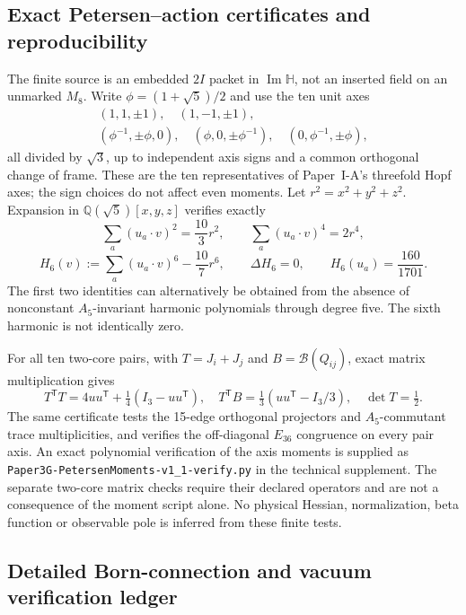 \documentclass[11pt,a4paper]{article}
\begin{document}
\subsection{Exact Petersen--action certificates and reproducibility}
\label{p3g:sec:v319-petersen-certificate}
The finite source is an embedded $2I$ packet in
$\operatorname{Im}\mathbb H$, not an inserted field on an unmarked
$M_8$.  Write $\phi=(1+\sqrt5)/2$ and use the ten unit axes
\[
 \begin{gathered}
 (1,1,\pm1),\quad(1,-1,\pm1),\\
 (\phi^{-1},\pm\phi,0),\quad
 (\phi,0,\pm\phi^{-1}),\quad
 (0,\phi^{-1},\pm\phi),
 \end{gathered}
\]
all divided by $\sqrt3$, up to independent axis signs and a common
orthogonal change of frame.  These are the ten representatives of
Paper~I-A's threefold Hopf axes; the sign choices do not affect even
moments.  Let $r^2=x^2+y^2+z^2$.  Expansion in
$\mathbb Q(\sqrt5)[x,y,z]$ verifies exactly
\[
 \sum_a(u_a\cdot v)^2=\frac{10}{3}r^2,\qquad
 \sum_a(u_a\cdot v)^4=2r^4,
\]
\[
 H_6(v):=\sum_a(u_a\cdot v)^6-\frac{10}{7}r^6,\qquad
 \Delta H_6=0,\qquad H_6(u_a)=\frac{160}{1701}.
\]
The first two identities can alternatively be obtained from the
absence of nonconstant $A_5$-invariant harmonic polynomials through
degree five.  The sixth harmonic is not identically zero.

For all ten two-core pairs, with $T=J_i+J_j$ and
$B=\mathcal B(Q_{ij})$, exact matrix multiplication gives
\[
 T^{\mathsf T}T=4uu^{\mathsf T}+\tfrac14(I_3-uu^{\mathsf T}),
\quad T^{\mathsf T}B=\tfrac13(uu^{\mathsf T}-I_3/3),
\quad \det T=\tfrac12.
\]
The same certificate tests the 15-edge orthogonal projectors and
$A_5$-commutant trace multiplicities, and verifies the off-diagonal
$E_{36}$ congruence on every pair axis.  An exact polynomial verification of the axis moments is supplied as
\texttt{Paper3G-PetersenMoments-v1\_1-verify.py} in the
technical supplement. The separate two-core matrix checks require their declared operators and are not a consequence of the moment script alone. No physical Hessian, normalization, beta function or
observable pole is inferred from these finite tests.


\subsection{Detailed Born-connection and vacuum verification ledger}
\label{p3g:sec:v346-technical-ledger}
\end{document}
